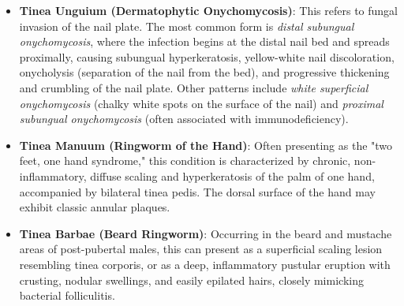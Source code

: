 \begin{itemize}
    \item \textbf{Tinea Unguium (Dermatophytic Onychomycosis)}: This refers to fungal invasion of the nail plate. The most common form is \textit{distal subungual onychomycosis}, where the infection begins at the distal nail bed and spreads proximally, causing subungual hyperkeratosis, yellow-white nail discoloration, onycholysis (separation of the nail from the bed), and progressive thickening and crumbling of the nail plate. Other patterns include \textit{white superficial onychomycosis} (chalky white spots on the surface of the nail) and \textit{proximal subungual onychomycosis} (often associated with immunodeficiency).
    \item \textbf{Tinea Manuum (Ringworm of the Hand)}: Often presenting as the "two feet, one hand syndrome," this condition is characterized by chronic, non-inflammatory, diffuse scaling and hyperkeratosis of the palm of one hand, accompanied by bilateral tinea pedis. The dorsal surface of the hand may exhibit classic annular plaques.
    \item \textbf{Tinea Barbae (Beard Ringworm)}: Occurring in the beard and mustache areas of post-pubertal males, this can present as a superficial scaling lesion resembling tinea corporis, or as a deep, inflammatory pustular eruption with crusting, nodular swellings, and easily epilated hairs, closely mimicking bacterial folliculitis.
\end{itemize}

